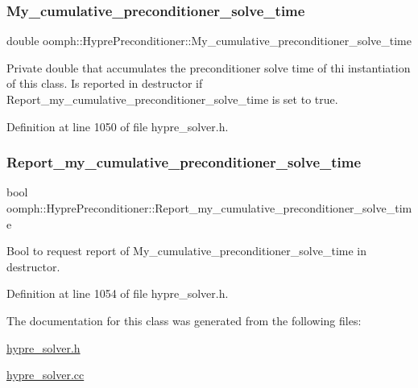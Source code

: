 \subsubsection{\texorpdfstring{My\+\_\+cumulative\+\_\+preconditioner\+\_\+solve\+\_\+time}{My\_cumulative\_preconditioner\_solve\_time}}
{\footnotesize\ttfamily double oomph\+::\+Hypre\+Preconditioner\+::\+My\+\_\+cumulative\+\_\+preconditioner\+\_\+solve\+\_\+time\hspace{0.3cm}{\ttfamily [private]}}



Private double that accumulates the preconditioner solve time of thi instantiation of this class. Is reported in destructor if Report\+\_\+my\+\_\+cumulative\+\_\+preconditioner\+\_\+solve\+\_\+time is set to true. 



Definition at line 1050 of file hypre\+\_\+solver.\+h.

\mbox{\label{classoomph_1_1HyprePreconditioner_a653e88aa4e4f65e16cbae13cc08014c7}} 
\subsubsection{\texorpdfstring{Report\+\_\+my\+\_\+cumulative\+\_\+preconditioner\+\_\+solve\+\_\+time}{Report\_my\_cumulative\_preconditioner\_solve\_time}}
{\footnotesize\ttfamily bool oomph\+::\+Hypre\+Preconditioner\+::\+Report\+\_\+my\+\_\+cumulative\+\_\+preconditioner\+\_\+solve\+\_\+time\hspace{0.3cm}{\ttfamily [private]}}



Bool to request report of My\+\_\+cumulative\+\_\+preconditioner\+\_\+solve\+\_\+time in destructor. 



Definition at line 1054 of file hypre\+\_\+solver.\+h.



The documentation for this class was generated from the following files\+:\begin{DoxyCompactItemize}
\item 
\hyperlink{hypre__solver_8h}{hypre\+\_\+solver.\+h}\item 
\hyperlink{hypre__solver_8cc}{hypre\+\_\+solver.\+cc}\end{DoxyCompactItemize}
